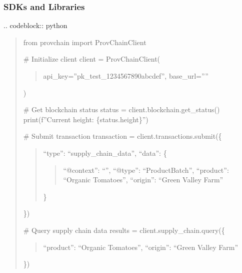 \documentclass[letterpaper,10pt,english]{sphinxmanual}
\begin{document}
\subsubsection{SDKs and Libraries}
\label{\detokenize{api/index:sdks-and-libraries}}
\sphinxAtStartPar
{}
.. code\sphinxhyphen{}block:: python
\begin{quote}

\sphinxAtStartPar
from provchain import ProvChainClient

\sphinxAtStartPar
\# Initialize client
client = ProvChainClient(
\begin{quote}

\sphinxAtStartPar
api\_key=”pk\_test\_1234567890abcdef”,
base\_url=””
\end{quote}

\sphinxAtStartPar
)

\sphinxAtStartPar
\# Get blockchain status
status = client.blockchain.get\_status()
print(f”Current height: \{status.height\}”)

\sphinxAtStartPar
\# Submit transaction
transaction = client.transactions.submit(\{
\begin{quote}

\sphinxAtStartPar
“type”: “supply\_chain\_data”,
“data”: \{
\begin{quote}

\sphinxAtStartPar
“@context”: “”,
“@type”: “ProductBatch”,
“product”: “Organic Tomatoes”,
“origin”: “Green Valley Farm”
\end{quote}

\sphinxAtStartPar
\}
\end{quote}

\sphinxAtStartPar
\})

\sphinxAtStartPar
\# Query supply chain data
results = client.supply\_chain.query(\{
\begin{quote}

\sphinxAtStartPar
“product”: “Organic Tomatoes”,
“origin”: “Green Valley Farm”
\end{quote}

\sphinxAtStartPar
\})
\end{quote}
\end{document}
